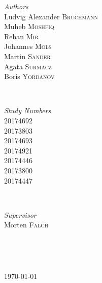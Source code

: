 \documentclass[12p]{article}
\begin{document}
\begin{titlepage}
 \begin{minipage}{0.4\textwidth}
 \begin{flushleft} \large
 \emph{Authors}\\
  Ludvig Alexander \textsc{Brüchmann} \\
  Muheb \textsc{Moshfiq} \\
 	Rehan \textsc{Mir} \\
 	Johannes \textsc{Mols} \\
 	Martin \textsc{Sander} \\
 	Agata \textsc{Surmacz} \\
 	Boris \textsc{Yordanov} \\
 \end{flushleft}
 \end{minipage}
 ~
 \begin{minipage}{0.4\textwidth}
 \begin{flushright} \large
 \emph{Study Numbers} \\
  20174692 \\
  20173803 \\
  20174693 \\
  20174921 \\
  20174446 \\
  20173800 \\
  20174447 \\
 \end{flushright}
 \end{minipage}\\[0.5cm]
 
 
 \begin{minipage}{0.4\textwidth}
 \begin{flushleft} \large
 \emph{Supervisor}\\
  Morten \textsc{Falch} \\
 \end{flushleft}
 \end{minipage}
 ~
 \begin{minipage}{0.4\textwidth}
 \begin{flushright} \large
 \end{flushright}
 \end{minipage}\\[0.5cm]

	
	\vfill\vfill\vfill %
	
	{\large\today} %
	
\end{titlepage}
\end{document}
